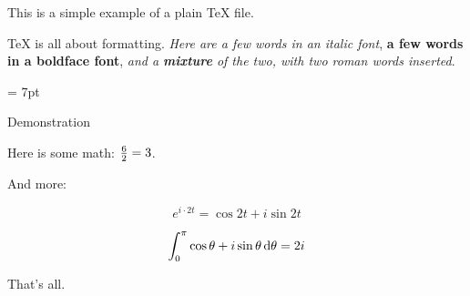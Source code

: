 This is a simple example of a plain \TeX{} file.

\TeX{} is all about formatting.
{\it Here are a few words in an italic font}, {\bf a
few words in a boldface font}, {\it and a\/ {\bf mixture}
of the two, with two\/ {\rm roman words} inserted}.

\parindent = 7pt

\beginsection Demonstration \par

Here is some math: ${6 \over 2} = 3$.

And more:
\def\arc#1{\cos #1 + i \sin #1}

$$e^{i\cdot2t} = {\arc{2t}}$$

$$\int_0^\pi \arc{\theta}\,{\rm d}\theta = 2i$$

That's all.

\bye
